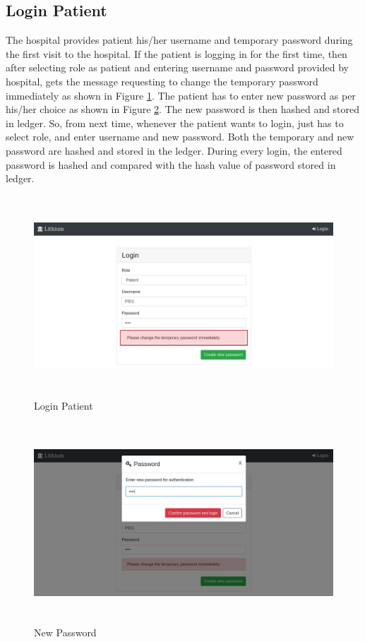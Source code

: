 \subsection{Login Patient}
The hospital provides patient his/her username and temporary password during the first visit to the hospital. If the patient is logging in for the first time, then after selecting role as patient and entering username and password provided by hospital, gets the message requesting to change the temporary password immediately as shown in Figure \ref{fig:chapter04:patient1}. The patient has to enter new password as per his/her choice as shown in Figure \ref{fig:chapter04:patient2}. The new password is then hashed and stored in ledger. So, from next time, whenever the patient wants to login, just has to select role, and enter username and new password. Both the temporary and new password are hashed and stored in the ledger. During every login, the entered password is hashed and compared with the hash value of password stored in ledger.
\begin{figure}[htbp]
 \centering
 \includegraphics[width=1.1\textwidth, height=7.5cm]{gfx/figures/patient1.jpg}
 \caption{Login Patient}
 \label{fig:chapter04:patient1}
\end{figure}

\begin{figure}[htbp]
 \centering
 \includegraphics[width=1.1\textwidth, height=7.5cm]{gfx/figures/patient2.jpg}
 \caption{New Password}
 \label{fig:chapter04:patient2}
\end{figure}

